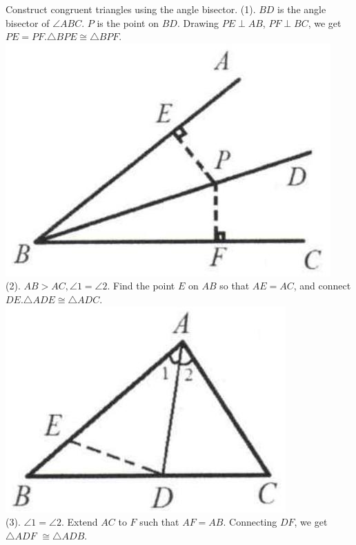 \documentclass[10pt]{article}
\begin{document}
Construct congruent triangles using the angle bisector.
(1). \(B D\) is the angle bisector of \(\angle A B C\). \(P\) is the point on \(B D\). Drawing \(P E \perp A B\), \(P F \perp B C\), we get \(P E=P F . \triangle B P E \cong \triangle B P F\).\\
\includegraphics[max width=\textwidth, center]{2025_04_17_97bc1f7e44d93c271a88g-054(1)}\\
(2). \(A B>A C, \angle 1=\angle 2\). Find the point \(E\) on \(A B\) so that \(A E=A C\), and connect \(D E . \triangle A D E \cong \triangle A D C\).\\
\includegraphics[max width=\textwidth, center]{2025_04_17_97bc1f7e44d93c271a88g-054}\\
(3). \(\angle 1=\angle 2\). Extend \(A C\) to \(F\) such that \(A F=A B\). Connecting \(D F\), we get \(\triangle A D F\) \(\cong \triangle A D B\).\\
\end{document}
